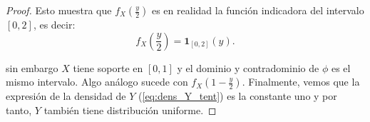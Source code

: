 \documentclass[../Main.tex]{subfiles}
\begin{document}
\begin{proof}
Esto muestra que $f_X\left(\frac{y}{2}\right)$ es en realidad la función indicadora del intervalo \([0,2]\), es decir:
\[
f_X\left(\frac{y}{2}\right) = \mathbf{1}_{[0,2]}(y).
\]

sin embargo $X$ tiene soporte en $[0,1]$ y el dominio y contradominio de $\phi$ es el mismo intervalo. Algo análogo sucede con $f_X\left(1-\frac{y}{2}\right)$. Finalmente, vemos que la expresión de la densidad de $Y$ (\ref{eq:dens_Y_tent}) es la constante uno y por tanto, $Y$ también tiene distribución uniforme. 
\end{proof}


  
\end{document}
